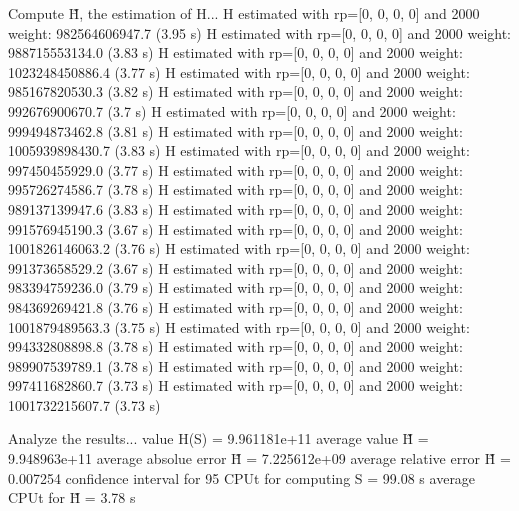 Compute H̃, the estimation of H...
  H estimated with rp=[0, 0, 0, 0] and 2000 weight:  982564606947.7  (3.95 s)
  H estimated with rp=[0, 0, 0, 0] and 2000 weight:  988715553134.0  (3.83 s)
  H estimated with rp=[0, 0, 0, 0] and 2000 weight:  1023248450886.4  (3.77 s)
  H estimated with rp=[0, 0, 0, 0] and 2000 weight:  985167820530.3  (3.82 s)
  H estimated with rp=[0, 0, 0, 0] and 2000 weight:  992676900670.7  (3.7 s)
  H estimated with rp=[0, 0, 0, 0] and 2000 weight:  999494873462.8  (3.81 s)
  H estimated with rp=[0, 0, 0, 0] and 2000 weight:  1005939898430.7  (3.83 s)
  H estimated with rp=[0, 0, 0, 0] and 2000 weight:  997450455929.0  (3.77 s)
  H estimated with rp=[0, 0, 0, 0] and 2000 weight:  995726274586.7  (3.78 s)
  H estimated with rp=[0, 0, 0, 0] and 2000 weight:  989137139947.6  (3.83 s)
  H estimated with rp=[0, 0, 0, 0] and 2000 weight:  991576945190.3  (3.67 s)
  H estimated with rp=[0, 0, 0, 0] and 2000 weight:  1001826146063.2  (3.76 s)
  H estimated with rp=[0, 0, 0, 0] and 2000 weight:  991373658529.2  (3.67 s)
  H estimated with rp=[0, 0, 0, 0] and 2000 weight:  983394759236.0  (3.79 s)
  H estimated with rp=[0, 0, 0, 0] and 2000 weight:  984369269421.8  (3.76 s)
  H estimated with rp=[0, 0, 0, 0] and 2000 weight:  1001879489563.3  (3.75 s)
  H estimated with rp=[0, 0, 0, 0] and 2000 weight:  994332808898.8  (3.78 s)
  H estimated with rp=[0, 0, 0, 0] and 2000 weight:  989907539789.1  (3.78 s)
  H estimated with rp=[0, 0, 0, 0] and 2000 weight:  997411682860.7  (3.73 s)
  H estimated with rp=[0, 0, 0, 0] and 2000 weight:  1001732215607.7  (3.73 s)

Analyze the results...
  value H(S)                  = 9.961181e+11 
  average value H̃             = 9.948963e+11 
  average absolue error H̃     = 7.225612e+09 
  average relative error H̃    = 0.007254 
  confidence interval for 95%
  CPUt for computing S         = 99.08 s
  average CPUt for H̃           = 3.78 s

